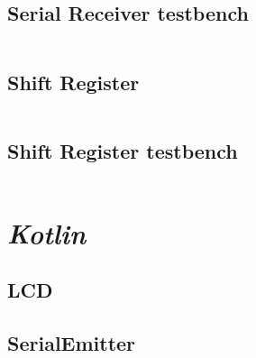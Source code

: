 \documentclass[10pt,a4paper,twocolumn]{article}
\begin{document}
\subsection{Serial Receiver testbench}
\label{sec:SerialReceiver_tb_VHDL}
\begin{minipage}{\linewidth}
\footnotesize
\inputminted{vhdl}{vhdl/SerialReceiver_tb.vhd}
\label{vhdl:SerialReceiver_tb}
\end{minipage}

\subsection{Shift Register}
\label{sec:shiftRegister_VHDL}
\begin{minipage}{\linewidth}
\footnotesize
\inputminted{vhdl}{vhdl/ShiftReg.vhd}
\label{vhdl:shiftRegister}
\end{minipage}

\subsection{Shift Register testbench}
\label{sec:shiftRegister_tb_VHDL}
\begin{minipage}{\linewidth}
\footnotesize
\inputminted{vhdl}{vhdl/ShiftReg_tb.vhd}
\label{vhdl:shiftRegister_tb}
\end{minipage}

\clearpage
\section{\textit{Kotlin}}
\subsection{LCD}


\subsection{SerialEmitter}

\end{document}
